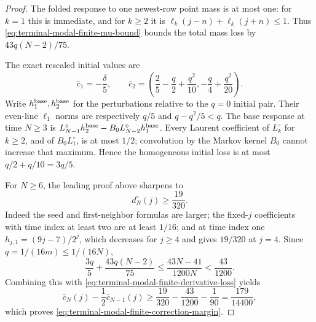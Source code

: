 \begin{proof}
The folded response to one newest-row point mass is at most one: for $k=1$
this is immediate, and for $k\ge2$ it is
$\ell_k(j-n)+\ell_k(j+n)\le1$.  Thus
\eqref{eq:terminal-modal-finite-mu-bound} bounds the total mass loss by
$43q(N-2)/75$.

The exact rescaled initial values are
\begin{equation}
 \bar c_1=-\frac\delta5,\qquad
 \bar c_2=\left(\frac25-\frac q2+\frac{q^2}{10},
 -\frac q4+\frac{q^2}{20}\right).
 \label{eq:terminal-modal-finite-initial-values}
\end{equation}
Write $h_1^{\rm base},h_2^{\rm base}$ for the perturbations relative to the
$q=0$ initial pair.  Their even-line $\ell_1$ norms are respectively $q/5$
and $q-q^2/5<q$.  The base response at time $N\ge3$ is
$L_{N-1}^\circ h_2^{\rm base}-B_0L_{N-2}^\circ h_1^{\rm base}$.  Every Laurent coefficient of
$L_k^\circ$ for $k\ge2$, and of $B_0L_1^\circ$, is at most $1/2$; convolution
by the Markov kernel $B_0$ cannot increase that maximum.  Hence the
homogeneous initial loss is at most $q/2+q/10=3q/5$.

For $N\ge6$, the leading proof above sharpens to
\begin{equation}
 d_N^\circ(j)\ge\frac{19}{320}.
 \label{eq:terminal-modal-leading-correction-late-margin}
\end{equation}
Indeed the seed and first-neighbor formulas are larger; the fixed-$j$
coefficients with time index at least two are at least $1/16$; and at time
index one
$h_{j,1}=(9j-7)/2^j$, which decreases for $j\ge4$ and gives $19/320$ at
$j=4$.  Since $q=1/(16m)\le1/(16N)$,
\[
 \frac{3q}{5}+\frac{43q(N-2)}{75}
 \le\frac{43N-41}{1200N}<\frac{43}{1200}.
\]
Combining this with \eqref{eq:terminal-modal-finite-derivative-loss} yields
\[
 \bar c_N(j)-\frac12\bar c_{N-1}(j)
 \ge\frac{19}{320}-\frac{43}{1200}-\frac1{90}
 =\frac{179}{14400},
\]
which proves \eqref{eq:terminal-modal-finite-correction-margin}.


\end{proof}
